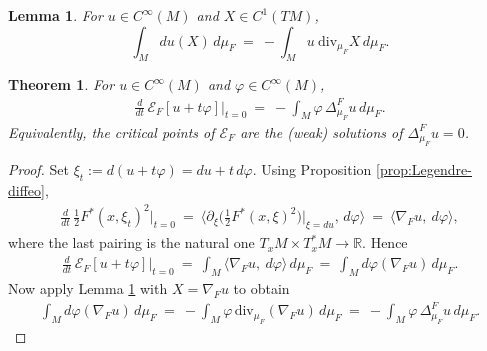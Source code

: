 \documentclass[10pt,a4paper]{amsart}
\newtheorem{lemma}{Lemma}
\newtheorem{theorem}{Theorem}
\begin{document}
\begin{lemma}\label{lem:ibp}
For $u\in C^\infty(M)$ and $X\in C^1(TM)$,
\begin{equation}\label{eq:ibp}
\int_M \! du(X)\,d\mu_F\ =\ -\int_M \! u\ \mathrm{div}_{\mu_F}X\,d\mu_F.
\end{equation}
\end{lemma}

\begin{theorem}\label{thm:EL-Dirichlet}
For $u\in C^\infty(M)$ and $\varphi\in C^\infty(M)$,
\begin{align*}
\frac{d}{dt}\,\mathcal{E}_F[u+t\varphi]\Big|_{t=0}
\ =\ -\int_M \varphi\, \Delta^F_{\mu_F}u\, d\mu_F.
\end{align*}
Equivalently, the critical points of $\mathcal{E}_F$ are the (weak) solutions of
$\Delta^F_{\mu_F} u=0$.
\end{theorem}

\begin{proof}
Set $\xi_t:=d(u+t\varphi)=du+t\,d\varphi$. Using Proposition \ref{prop:Legendre-diffeo},
\begin{align*}
\frac{d}{dt}\,\frac 12 F^*(x,\xi_t)^2\Big|_{t=0}
\ =\ \Big\langle \partial_\xi\!\Big(\tfrac 12 F^*(x,\xi)^2\Big)\Big|_{\xi=du}\!,\, d\varphi\Big\rangle
\ =\ \langle \nabla_F u,\ d\varphi\rangle,
\end{align*}
where the last pairing is the natural one $T_xM\times T_x^*M\to\mathbb{R}$. Hence
\begin{align*}
\frac{d}{dt}\,\mathcal{E}_F[u+t\varphi]\Big|_{t=0}
\ =\ \int_M \! \langle \nabla_F u,\ d\varphi\rangle\, d\mu_F
\ =\ \int_M \! d\varphi(\nabla_F u)\, d\mu_F.
\end{align*}
Now apply Lemma \ref{lem:ibp} with $X=\nabla_F u$ to obtain
\begin{align*}
\int_M d\varphi(\nabla_F u)\, d\mu_F
\ =\ -\int_M \varphi\, \mathrm{div}_{\mu_F}(\nabla_F u)\, d\mu_F
\ =\ -\int_M \varphi\, \Delta^F_{\mu_F}u\, d\mu_F.
\end{align*}
\end{proof}
\end{document}
